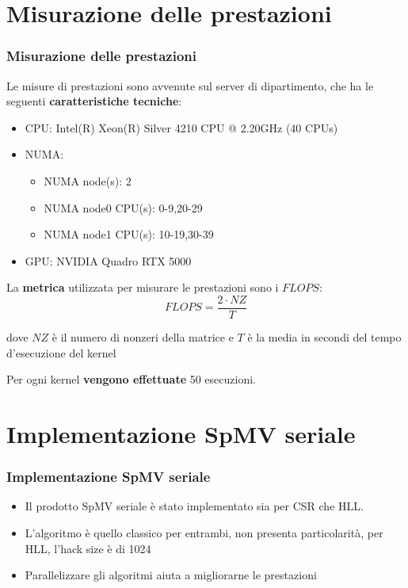 \documentclass{beamer}
\begin{document}
\section{Misurazione delle prestazioni}
\begin{frame}
    \frametitle{Misurazione delle prestazioni}
    
    Le misure di prestazioni sono avvenute sul server di dipartimento, che ha le seguenti 
    \textbf{caratteristiche tecniche}:
    
    \begin{itemize}
    	\item CPU: Intel(R) Xeon(R) Silver 4210 CPU @ 2.20GHz (40 CPUs)
    	\item NUMA:
    	\begin{itemize}
    		\item NUMA node(s): 2
    		\item NUMA node0 CPU(s): 0-9,20-29
    		\item NUMA node1 CPU(s): 10-19,30-39
    	\end{itemize}
    	\item GPU: NVIDIA Quadro RTX 5000
    \end{itemize}
    
    La \textbf{metrica} utilizzata per misurare le prestazioni sono i $FLOPS$:
    \begin{equation*}
    FLOPS = \frac{2 \cdot NZ}{T}
    \end{equation*}
    
    dove $NZ$ è il numero di nonzeri della matrice e 
    $T$ è la media in secondi del tempo d'esecuzione del kernel
    
    Per ogni kernel \textbf{vengono effettuate} 50 esecuzioni.
    
\end{frame}

\section{Implementazione SpMV seriale}
\begin{frame}
    \frametitle{Implementazione SpMV seriale}
    
    \begin{itemize}
    	\item Il prodotto SpMV seriale è stato implementato sia per CSR che HLL.
    
    	\item L'algoritmo è quello classico per entrambi, non presenta particolarità, per
    	HLL, l'hack size è di 1024
    	
    	\item Parallelizzare gli algoritmi aiuta a migliorarne le prestazioni
    \end{itemize}
    
\end{frame}
\end{document}
